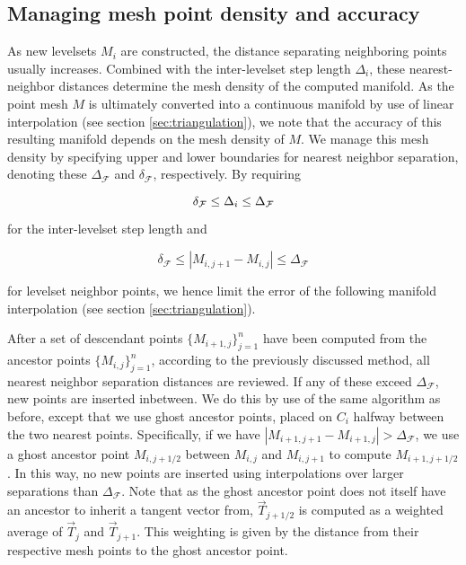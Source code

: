 \subsection{Managing mesh point density and accuracy}\label{sec:grid_management}

As new levelsets $M_i$  are constructed, the distance separating neighboring points usually increases. Combined with the inter-levelset step length $\Delta_i$, these nearest-neighbor distances determine the mesh density of the computed manifold. As the point mesh $M$ is ultimately converted into a continuous manifold by use of linear interpolation (see section \ref{sec:triangulation}), we note that the accuracy of this resulting manifold depends on the mesh density of $M$. We manage this mesh density by specifying upper and lower boundaries for nearest neighbor separation, denoting these $\Delta_{\mathcal{F}}$ and $\delta_{\mathcal{F}}$, respectively. By requiring

\begin{equation}\label{eq:dist_bound_a}
\delta_{\mathcal{F}} \leq \Delta_i \leq \Delta_{\mathcal{F}}\\
\end{equation}

\noindent for the inter-levelset step length and

\begin{equation}\label{eq:dist_bound_b}
\delta_{\mathcal{F}} \leq \left| M_{i,j+1} - M_{i,j} \right| \leq \Delta_{\mathcal{F}}
\end{equation}

\noindent for levelset neighbor points, we hence limit the error of the following manifold interpolation (see section \ref{sec:triangulation}).


After a set of descendant points $\{M_{i+1,j}\}_{j=1}^n$ have been computed from the ancestor points $\{M_{i,j}\}_{j=1}^n$, according to the previously discussed method, all nearest neighbor separation distances are reviewed. If any of these exceed $\Delta_{\mathcal{F}}$, new points are inserted inbetween. We do this by use of the same algorithm as before, except that we use ghost ancestor points, placed on $C_i$ halfway between the two nearest points. Specifically, if we have 
$\left|M_{i+1,j+1}-M_{i+1,j}\right|>\Delta_{\mathcal{F}}$, we use a ghost ancestor point $M_{i,j+1/2}$ between $M_{i,j}$ and $M_{i,j+1}$ to compute $M_{i+1,j+1/2}$. In this way, no new points are inserted using interpolations over larger separations than $\Delta_{\mathcal{F}}$. Note that as the ghost ancestor point does not itself have an ancestor to inherit a tangent vector from, $\vec{T}_{j+1/2}$ is computed as a weighted average of $\vec{T}_{j}$  and $\vec{T}_{j+1}$. This weighting is given by the distance from their respective mesh points to the ghost ancestor point.


